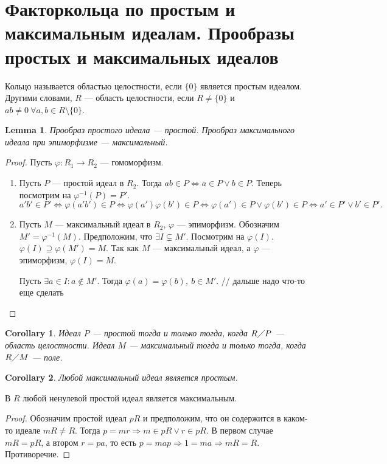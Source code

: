 \documentclass[11pt]{book}
\newcommand{\po}{\diagup}
\theoremstyle{definition}
\theoremstyle{plain}
\theoremstyle{plain}
\newtheorem{lm}{Lemma}
\newtheorem{cor}{Corollary}
\theoremstyle{definition}
\theoremstyle{remark}
\begin{document}
\section{Факторкольца по простым и максимальным идеалам. Прообразы простых и максимальных идеалов}
\begin{defn}
    Кольцо называется {\sf областью целостности}, если $ \{0\}$ является простым идеалом. Другими словами, $ R $ --- область целостности, если  $ R \ne \{0\}$ и $ ab \ne  0 ~ \forall a, b \in R \setminus \{0\}$.
\end{defn}
\begin{lm}
    Прообраз простого идеала --- простой. Прообраз максимального идеала при эпиморфизме --- максимальный.
\end{lm}
\begin{proof}
    Пусть $ \varphi : R_1 \to R_2 $ --- гомоморфизм.
    \begin{enumerate}
	\item Пусть $ P$ ---  простой идеал в $ R_2$.
	    Тогда
	    $ ab \in  P \Longleftrightarrow  a \in  P \vee b \in  P$.
	    Теперь посмотрим на $ \varphi^{-1}(P) = P'$.
	    \[
		a'b' \in P' \Longleftrightarrow \varphi (a'b') \in P \Longleftrightarrow \varphi (a') \varphi (b') \in P \Longleftrightarrow \varphi (a') \in P \vee \varphi (b') \in P \Longleftrightarrow a' \in P' \vee b' \in P'
	    .\]
	\item Пусть $ M$ --- максимальный идеал в $ R_2$,  $ \varphi $ --- эпиморфизм.
	    Обозначим $ M' = \varphi^{-1}(M)$.
	    Предположим, что $ \exists I \subsetneq M'$. Посмотрим на $ \varphi (I)$. $ \varphi (I) \supseteq \varphi (M') = M$. Так как $ M$ --- максимальный идеал, а $ \varphi $ --- эпиморфизм,  $ \varphi (I) = M$.

	    Пусть $ \exists a \in I: a \not\in M'$. Тогда $ \varphi (a) = \varphi (b), ~ b \in M'$.
	    // дальше надо что-то еще сделать
    \end{enumerate}
\end{proof}
\begin{cor}
    Идеал $ P$ --- простой  тогда и только тогда, когда $ R \po P$ --- область целостности.
    Идеал $ M$ --- максимальный  тогда и только тогда, когда  $ R \po M$ --- поле.
\end{cor}
\begin{cor}\label{cor_max_p}
    Любой максимальный идеал является простым.
\end{cor}
\begin{thm}
    В $ R$ любой ненулевой простой идеал является максимальным.
\end{thm}
\begin{proof}
    Обозначим простой идеал $ pR$ и предположим, что он содержится в каком-то идеале $ mR \ne R$.
    Тогда  $ p = mr \Longrightarrow m \in  pR \vee r \in  pR$. В первом случае $ mR = pR$, а втором  $ r = pa$, то есть $ p = map \Longrightarrow  1 = ma \Longrightarrow  mR = R$. Противоречие.
\end{proof}
\end{document}
